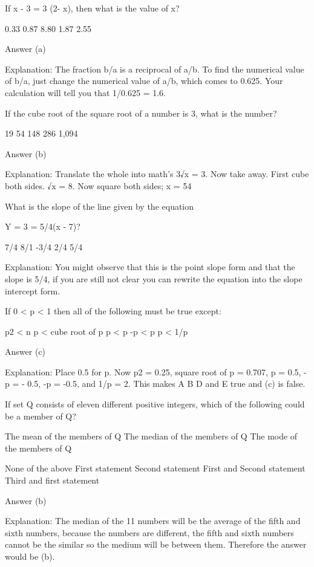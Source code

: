     If x - 3 = 3 (2- x), then what is the value of x?

        0.33
        0.87
        8.80
        1.87
        2.55 

    Answer (a)

    Explanation: The fraction b/a is a reciprocal of a/b. To find the numerical value of b/a, just change the numerical value of a/b, which comes to 0.625. Your calculation will tell you that 1/0.625 = 1.6.

    If the cube root of the square root of a number is 3, what is the number?

        19
        54
        148
        286
        1,094 

    Answer (b)

    Explanation: Translate the whole into math's 3√x = 3. Now take away. First cube both sides. √x = 8. Now square both sides; x = 54

    What is the slope of the line given by the equation

    Y = 3 = 5/4(x - 7)?

        7/4
        8/1
        -3/4
        2/4
        5/4 

    Explanation: You might observe that this is the point slope form and that the slope is 5/4, if you are still not clear you can rewrite the equation into the slope intercept form. 



    If 0 < p < 1 then all of the following must be true except:

        p2 < n
        p < cube root of p
        p < p
        -p < p
        p < 1/p 

    Answer (c)

    Explanation: Place 0.5 for p. Now p2 = 0.25, square root of p = 0.707, p = 0.5, - p = - 0.5, -p = -0.5, and 1/p = 2. This makes A B D and E true and (c) is false.

    If set Q consists of eleven different positive integers, which of the following could be a member of Q?

        The mean of the members of Q
        The median of the members of Q
        The mode of the members of Q 

        None of the above
        First statement
        Second statement
        First and Second statement
        Third and first statement 

    Answer (b)

    Explanation: The median of the 11 numbers will be the average of the fifth and sixth numbers, because the numbers are different, the fifth and sixth numbers cannot be the similar so the medium will be between them. Therefore the answer  would be (b).

